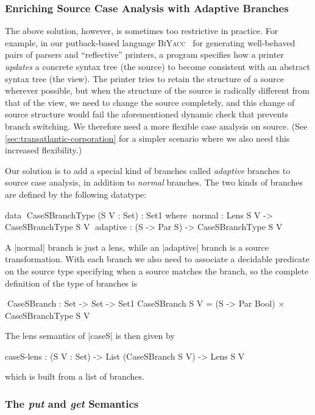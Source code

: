 \documentclass{sigplanconf}
\renewcommand{\emph}{\textsl}
\newcommand{\BiYacc}{\textsc{BiYacc}}
\begin{document}
\subsubsection{Enriching Source Case Analysis with Adaptive Branches}

The above solution, however, is sometimes too restrictive in practice.
For example, in our putback-based language \BiYacc~\cite{Zhu-BiYacc} for generating well-behaved pairs of parsers and ``reflective'' printers, a program specifies how a printer \emph{updates} a concrete syntax tree (the source) to become consistent with an abstract syntax tree (the view).
The printer tries to retain the structure of a source wherever possible, but when the structure of the source is radically different from that of the view, we need to change the source completely, and this change of source structure would fail the aforementioned dynamic check that prevents branch switching.
We therefore need a more flexible case analysis on source.
(See \autoref{sec:transatlantic-corporation} for a simpler scenario where we also need this increased flexibility.)

Our solution is to add a special kind of branches called \emph{adaptive} branches to source case analysis, in addition to \emph{normal} branches.
The two kinds of branches are defined by the following datatype:
\begin{code}
data ^^^CaseSBranchType (S V : Set) : Set1 where
  ^^^normal    : Lens S V      -> CaseSBranchType S V
  ^^^adaptive  : (S -> Par S)  -> CaseSBranchType S V
\end{code}
A |normal| branch is just a lens, while an |adaptive| branch is a source transformation.
With each branch we also need to associate a decidable predicate on the source type specifying when a source matches the branch, so the complete definition of the type of branches is
\begin{code}
^^^CaseSBranch : Set -> Set -> Set1
CaseSBranch S V = (S -> Par Bool) × CaseSBranchType S V
\end{code}
The lens semantics of |caseS| is then given by
\begin{code}
caseS-lens : (S V : Set) -> List (CaseSBranch S V) -> Lens S V
\end{code}
which is built from a list of branches.

\subsubsection{The \textit{put} and \textit{get} Semantics}
\label{sec:caseS-put-and-get}
\end{document}
